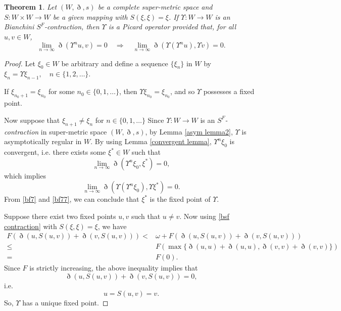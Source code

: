 \documentclass[pdflatex,sn-mathphys-num]{sn-jnl}%
\theoremstyle{thmstyleone}%
\newtheorem{theorem}{Theorem}%
\theoremstyle{thmstyletwo}%
\theoremstyle{thmstylethree}%
\begin{document}
\begin{theorem}\label{bsf theorem}
      Let $(W,\eth,s)$ be a complete super-metric space and $S:W\times W \to W$ be a given mapping  with $S(\xi,\xi)=\xi$. 
If $\Upsilon  : W \to W$ is an \textit{Bianchini $S^F$-contraction}, then $\Upsilon $ is a \textit{Picard operator} provided that, for all $u,v \in W$,
\[
\lim_{n \to \infty} \eth(\Upsilon^n u, v) = 0 
\quad \Longrightarrow \quad 
\lim_{n \to \infty} \eth(\Upsilon(\Upsilon^n u), \Upsilon  v) = 0.
\]
\end{theorem}
\begin{proof}
     Let $\xi_0 \in W$ be arbitrary and define a sequence $\{\xi_n\}$ in $W$ by $\xi_n = \Upsilon \xi _{n-1}, \quad n \in \{1,2,\ldots\}$.

If $\xi_{n_0+1} = \xi_{n_0}$ for some $n_0 \in \{0,1,\ldots\}$, then $\Upsilon \xi_{n_0} = \xi_{n_0}$, and so $\Upsilon $ possesses a fixed point.

Now suppose that $\xi_{n+1} \neq \xi_n$ for $n \in \{0,1,\ldots\}$
    Since $\Upsilon : W \to W$ is an \textit{$S^F$-contraction} in super-metric space $(W,\eth,s)$, by Lemma \ref{asym lemma2}, $\Upsilon $ is asymptotically regular in $W$. By using Lemma \ref{convergent lemma}, $\Upsilon^n \xi_0$ is convergent, i.e. 
  there exists some $\xi^* \in W$ such that \begin{equation}\label{bf7}
    \lim_{n \to \infty} \eth(\Upsilon^n\xi_0,\xi^*)=0,
\end{equation} 
which implies  \begin{equation}\label{bf77}
    \lim_{n \to \infty} \eth(\Upsilon(\Upsilon^n\xi_0),\Upsilon \xi ^*)=0.
\end{equation} 
From \eqref{bf7} and \eqref{bf77}, we can conclude that  $\xi^*$ is the fixed point of $\Upsilon $.

Suppose there exist two fixed points $u,v$ such that $u\ne v$. Now using \eqref{bsf contraction}  with $S(\xi,\xi)=\xi$, we have
\begin{align*}
   F\left(\eth(u,S(u,v))+\eth(v,S(u,v))\right)<& \omega  + F\left(\eth(u,S(u,v))+\eth(v,S(u,v))\right)\\
   \le& F\left(\max\{\eth(u,u)+\eth(u,u),\eth(v,v)+\eth(v,v)\}\right)\\
   =& F(0).
\end{align*}
Since $F$ is strictly increasing, the above inequality implies that 
\begin{equation*}
    \eth(u,S(u,v))+\eth(v,S(u,v))=0,
\end{equation*}
i.e. \begin{equation}\label{bf8}
    u=S(u,v)=v.
\end{equation} 
So, $\Upsilon $ has a unique fixed point.
\end{proof}
\end{document}
